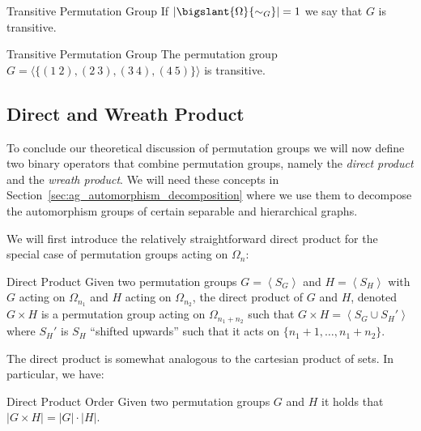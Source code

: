 \begin{defn}{Transitive Permutation Group}
  If $|\bigslant{\Omega}{\sim_G}| = 1$ we say that $G$ is transitive.
\end{defn}

\begin{exmp}{Transitive Permutation Group}
  The permutation group $G = \langle \{(1\ 2),(2\ 3),(3\ 4),(4\ 5)\} \rangle$
  is transitive.
\end{exmp}

\subsection{Direct and Wreath Product}
\label{sec:pg_direct_and_wreath_product}

To conclude our theoretical discussion of permutation groups we will now define
two binary operators that combine permutation groups, namely the \textit{direct
product} and the \textit{wreath product}. We will need these concepts in
Section~\ref{sec:ag_automorphism_decomposition} where we use them to decompose
the automorphism groups of certain separable and hierarchical graphs.

We will first introduce the relatively straightforward direct product for the
special case of permutation groups acting on $\Omega_n$:

\begin{defn}[label=defn:direct_product]{Direct Product}
  Given two permutation groups $G = \left<S_G\right>$ and $H = \left<S_H\right>$
  with $G$ acting on $\Omega_{n_1}$ and $H$ acting on $\Omega_{n_2}$, the direct
  product of $G$ and $H$, denoted $G \times H$ is a permutation group acting on
  $\Omega_{n_1 + n_2}$ such that $G \times H = \left<S_G \cup S_H'\right>$ where
  $S_H'$ is $S_H$ ``shifted upwards'' such that it acts on $\{n_1 + 1, \dots, n_1
  + n_2\}$.
\end{defn}
%
The direct product is somewhat analogous to the cartesian product of sets.
In particular, we have:

\begin{lemma}{Direct Product Order}
  Given two permutation groups $G$ and $H$ it holds that $|G \times H| = |G|
  \cdot |H|$.
\end{lemma}

